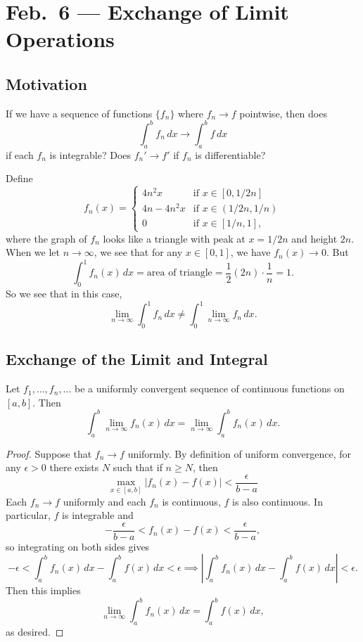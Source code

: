 \chapter{Feb.~6 --- Exchange of Limit Operations}

\section{Motivation}
If we have a sequence of functions $\{f_n\}$ where
$f_n \to f$ pointwise, then does
\[
  \int_a^b f_n\, dx \to \int_a^b f\, dx
\]
if each $f_n$ is integrable? Does
$f_n' \to f'$ if $f_n$ is differentiable?

\begin{example}
  Define
  \[
    f_n(x) =
    \begin{cases}
      4n^2 x & \text{if } x \in [0, 1 / 2n] \\
      4n - 4n^2 x & \text{if } x \in (1 / 2n, 1 / n) \\
      0 & \text{if } x \in [1 / n, 1],
    \end{cases}
  \]
  where the graph of $f_n$ looks like a triangle with
  peak at $x = 1 / 2n$ and height $2n$.
  When we let $n \to \infty$, we see that for any
  $x \in [0, 1]$, we have $f_n(x) \to 0$. But
  \[
    \int_0^1 f_n(x)\, dx = \text{area of triangle}
    = \frac{1}{2} (2n) \cdot \frac{1}{n} = 1.
  \]
  So we see that in this case,
  \[
    \lim_{n \to \infty} \int_0^1 f_n \, dx \ne \int_0^1 \lim_{n \to \infty} f_n \, dx.
  \]
\end{example}

\section{Exchange of the Limit and Integral}

\begin{theorem}
  Let $f_1, \dots, f_n, \dots$ be a uniformly
  convergent sequence of continuous functions
  on $[a, b]$. Then
  \[
    \int_a^b \lim_{n \to \infty} f_n(x)\, dx
    = \lim_{n \to \infty} \int_a^b f_n(x)\, dx.
  \]
\end{theorem}

\begin{proof}
  Suppose that $f_n \to f$ uniformly.
  By definition of uniform convergence, for any
  $\epsilon > 0$ there exists $N$ such that if
  $n \ge N$, then
  \[
    \max_{x \in [a, b]}|f_n(x) - f(x)| < \frac{\epsilon}{b - a}
  \]
  Each $f_n \to f$ uniformly and each $f_n$ is continuous,
  $f$ is also continuous. In particular, $f$ is
  integrable and
  \[
    -\frac{\epsilon}{b - a} < f_n(x) - f(x) < \frac{\epsilon}{b - a},
  \]
  so integrating on both sides gives
  \[
    -\epsilon < \int_a^b f_n(x)\, dx - \int_a^b f(x)\, dx < \epsilon \implies
    \left| \int_a^b f_n(x)\, dx - \int_a^b f(x)\, dx \right| < \epsilon.
  \]
  Then this implies
  \[
    \lim_{n \to \infty} \int_a^b f_n(x)\, dx = \int_a^b f(x)\, dx,
  \]
  as desired.
\end{proof}

